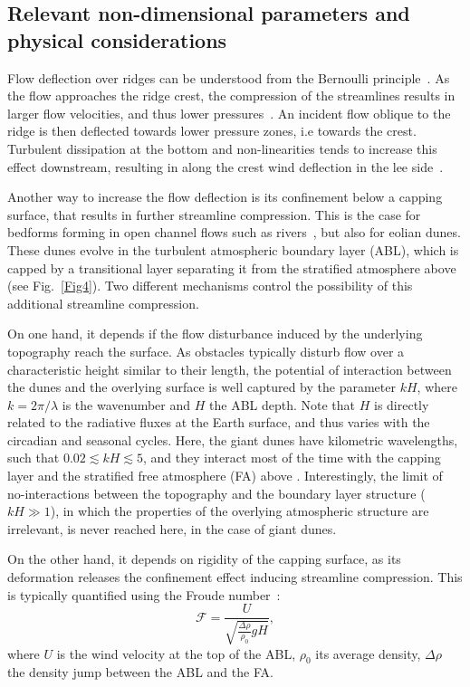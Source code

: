   \subsection{Relevant non-dimensional parameters and physical considerations}
  \label{theoretical_framework}

  Flow deflection over ridges can be understood from the Bernoulli principle~\citep{Hesp2015}. As the flow approaches the ridge crest, the compression of the streamlines results in larger flow velocities, and thus lower pressures~\citep{Rubin1987}. An incident flow oblique to the ridge is then deflected towards lower pressure zones, i.e towards the crest. Turbulent dissipation at the bottom and non-linearities tends to increase this effect downstream, resulting in along the crest wind deflection in the lee side~\citep{Hesp2015, Gadal2019}.

  Another way to increase the flow deflection is its confinement below a capping surface, that results in further streamline compression. This is the case for bedforms forming in open channel flows such as rivers~\citep{Fourriere2010, Unsworth2018}, but also for eolian dunes. These dunes evolve in the turbulent atmospheric boundary layer (ABL), which is capped by a transitional layer separating it from the stratified atmosphere above (see Fig.~\ref{Fig4}). Two different mechanisms control the possibility of this additional streamline compression.

  On one hand, it depends if the flow disturbance induced by the underlying topography reach the surface. As obstacles typically disturb flow over a characteristic height similar to their length, the potential of interaction between the dunes and the overlying surface is well captured by the parameter $k H$, where $k = 2\pi/\lambda$ is the wavenumber and $H$ the ABL depth. Note that $H$ is directly related to the radiative fluxes at the Earth surface, and thus varies with the circadian and seasonal cycles. Here, the giant dunes have kilometric wavelengths, such that $0.02 \lesssim k H \lesssim 5$, and they interact most of the time with the capping layer and the stratified free atmosphere (FA) above \citep{andreotti2009}. Interestingly, the limit of no-interactions between the topography and the boundary layer structure ($k H \gg 1$), in which the properties of the overlying atmospheric structure are irrelevant, is never reached here, in the case of giant dunes.

  On the other hand, it depends on rigidity of the capping surface, as its deformation releases the confinement effect inducing streamline compression. This is typically quantified using the Froude number~\citep{Vosper2004, Stull2006, Sheridan2006, Hunt2006, Jiang2014}:
  \begin{equation}
        \mathcal{F} = \displaystyle\frac{U}{\sqrt{\displaystyle\frac{\Delta\rho}{\rho_{0}}gH}},
  \end{equation}
  where $U$ is the wind velocity at the top of the ABL, $\rho_{0}$ its average density, $\Delta\rho$ the density jump between the ABL and the FA.


